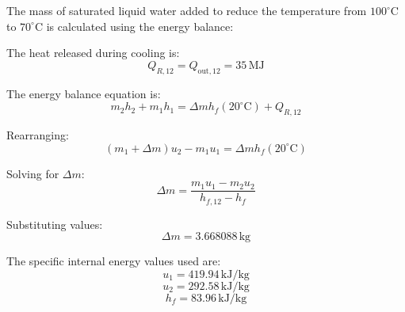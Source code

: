 The mass of saturated liquid water added to reduce the temperature from \(100^\circ\text{C}\) to \(70^\circ\text{C}\) is calculated using the energy balance:  

The heat released during cooling is:  
\[
Q_{R,12} = Q_{\text{out},12} = 35 \, \text{MJ}
\]

The energy balance equation is:  
\[
m_2 h_2 + m_1 h_1 = \Delta m h_f(20^\circ\text{C}) + Q_{R,12}
\]

Rearranging:  
\[
(m_1 + \Delta m) u_2 - m_1 u_1 = \Delta m h_f(20^\circ\text{C})
\]

Solving for \( \Delta m \):  
\[
\Delta m = \frac{m_1 u_1 - m_2 u_2}{h_{f,12} - h_f}
\]

Substituting values:  
\[
\Delta m = 3.668088 \, \text{kg}
\]

The specific internal energy values used are:  
\[
u_1 = 419.94 \, \text{kJ/kg}
\]
\[
u_2 = 292.58 \, \text{kJ/kg}
\]
\[
h_f = 83.96 \, \text{kJ/kg}
\]